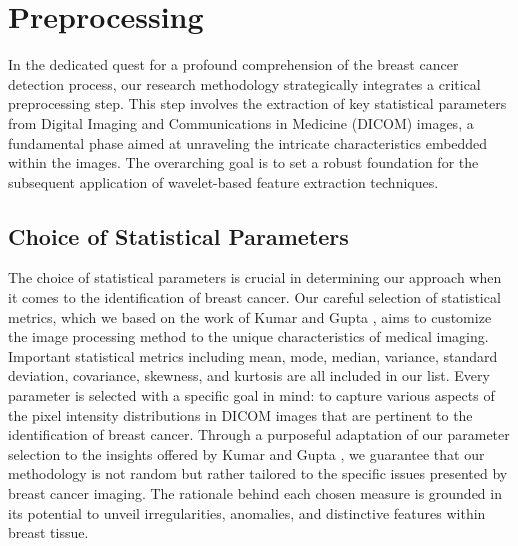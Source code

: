 \section{Preprocessing}
In the dedicated quest for a profound comprehension of the breast cancer detection process, our research methodology strategically integrates a critical preprocessing step. This step involves the extraction of key statistical parameters from Digital Imaging and Communications in Medicine (DICOM) images, a fundamental phase aimed at unraveling the intricate characteristics embedded within the images. The overarching goal is to set a robust foundation for the subsequent application of wavelet-based feature extraction techniques.
\subsection{Choice of Statistical Parameters}
The choice of statistical parameters is crucial in determining our approach when it comes to the identification of breast cancer. Our careful selection of statistical metrics, which we based on the work of Kumar and Gupta \cite{importancestats}, aims to customize the image processing method to the unique characteristics of medical imaging.
Important statistical metrics including mean, mode, median, variance, standard deviation, covariance, skewness, and kurtosis are all included in our list. Every parameter is selected with a specific goal in mind: to capture various aspects of the pixel intensity distributions in DICOM images that are pertinent to the identification of breast cancer.
Through a purposeful adaptation of our parameter selection to the insights offered by Kumar and Gupta \cite{importancestats}, we guarantee that our methodology is not random but rather tailored to the specific issues presented by breast cancer imaging. The rationale behind each chosen measure is grounded in its potential to unveil irregularities, anomalies, and distinctive features within breast tissue.
